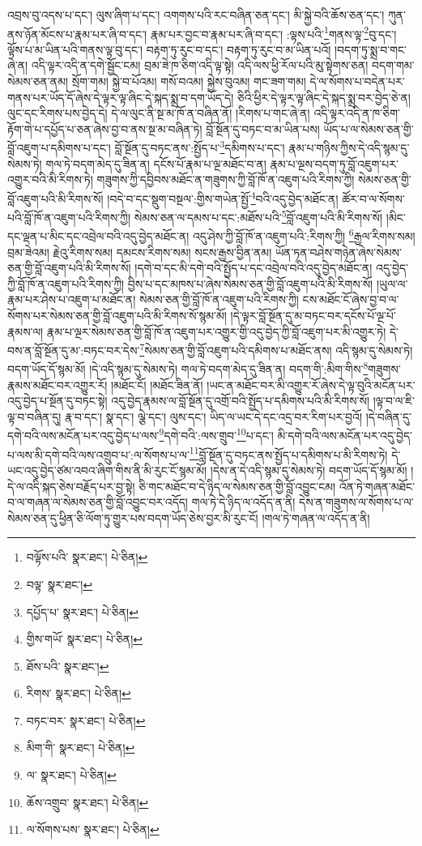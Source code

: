 འབྲས་བུ་འདས་པ་དང་། ལུས་ཞིག་པ་དང་། འགགས་པའི་རང་བཞིན་ཅན་དང་། མི་སྐྱེ་བའི་ཆོས་ཅན་དང་། ཀུན་ནས་ཉོན་མོངས་པ་རྣམ་པར་ཞི་བ་དང་། རྣམ་པར་བྱང་བ་རྣམ་པར་ཞི་བ་དང་། :ལྟས་པའི་\footnote{བལྟོས་པའི་  སྣར་ཐང་།  པེ་ཅིན། }གནས་ལྟ་\footnote{བལྟ་  སྣར་ཐང་། }བུ་དང་། ལྟོས་པ་མ་ཡིན་པའི་གནས་ལྟ་བུ་དང་། བརྟག་ཏུ་རུང་བ་དང་། བརྟག་ཏུ་རུང་བ་མ་ཡིན་པའོ། །བདག་ཏུ་སྨྲ་བ་གང་ཞེ་ན། འདི་ལྟར་འདི་ན་དགེ་སྦྱོང་ངམ། བྲམ་ཟེ་ཁ་ཅིག་འདི་ལྟ་སྟེ། འདི་ལས་ཕྱི་རོལ་པའི་མུ་སྟེགས་ཅན། བདག་གམ་སེམས་ཅན་ནམ། སྲོག་གམ། སྐྱེ་བ་པོའམ། གསོ་བའམ། སྐྱེས་བུའམ། གང་ཟག་གམ། དེ་ལ་སོགས་པ་བདེན་པར་གནས་པར་ཡོད་དོ་ཞེས་དེ་ལྟར་ལྟ་ཞིང་དེ་སྐད་སྨྲ་བ་དག་ཡོད་དེ། ཅིའི་ཕྱིར་དེ་ལྟར་ལྟ་ཞིང་དེ་སྐད་སྨྲ་བར་བྱེད་ཅེ་ན། ལུང་དང་རིགས་པས་བྱེད་དེ། དེ་ལ་ལུང་ནི་སྔ་མ་ཁོ་ན་བཞིན་ནོ། །རིགས་པ་གང་ཞེ་ན། འདི་ལྟར་འདི་ན་ཁ་ཅིག་རྟོག་གེ་པ་དཔྱོད་པ་ཅན་ཞེས་བྱ་བ་ནས་སྔ་མ་བཞིན་ཏེ། བློ་སྔོན་དུ་བཏང་བ་མ་ཡིན་པས། ཡོད་པ་ལ་སེམས་ཅན་གྱི་བློ་འཇུག་པ་དམིགས་པ་དང་། བློ་སྔོན་དུ་བཏང་ནས་:སྤྱོད་པ་\footnote{དཔྱོད་པ་  སྣར་ཐང་།  པེ་ཅིན། }དམིགས་པ་དང་། རྣམ་པ་གཉིས་ཀྱིས་དེ་འདི་སྙམ་དུ་སེམས་ཏེ། གལ་ཏེ་བདག་མེད་དུ་ཟིན་ན། དངོས་པོ་རྣམ་པ་ལྔ་མཐོང་བ་ན། རྣམ་པ་ལྔས་བདག་ཏུ་བློ་འཇུག་པར་འགྱུར་བའི་མི་རིགས་ཏེ། གཟུགས་ཀྱི་དབྱིབས་མཐོང་ན་གཟུགས་ཀྱི་བློ་ཁོ་ན་འཇུག་པའི་རིགས་ཀྱི། སེམས་ཅན་གྱི་བློ་འཇུག་པའི་མི་རིགས་སོ། །བདེ་བ་དང་སྡུག་བསྔལ་:གྱིས་གཡེན་སྤྱོ་\footnote{གྱིས་གཡོ་  སྣར་ཐང་།  པེ་ཅིན། }བའི་འདུ་བྱེད་མཐོང་ན། ཚོར་བ་ལ་སོགས་པའི་བློ་ཁོ་ན་འཇུག་པའི་རིགས་ཀྱི། སེམས་ཅན་ལ་དམས་པ་དང་:མཐོས་པའི་\footnote{ཐོས་པའི་  སྣར་ཐང་། }བློ་འཇུག་པའི་མི་རིགས་སོ། །མིང་དང་ལྡན་པ་མིང་དང་འབྲེལ་བའི་འདུ་བྱེད་མཐོང་ན། འདུ་ཤེས་ཀྱི་བློ་ཁོ་ན་འཇུག་པའི་:རིགས་ཀྱི། \footnote{རིགས་  སྣར་ཐང་།  པེ་ཅིན། }རྒྱལ་རིགས་སམ། བྲམ་ཟེའམ། རྗེའུ་རིགས་སམ། དམངས་རིགས་སམ། སངས་རྒྱས་བྱིན་ནམ། ཡོན་ཏན་བཤེས་གཉེན་ཞེས་སེམས་ཅན་གྱི་བློ་འཇུག་པའི་མི་རིགས་སོ། །དགེ་བ་དང་མི་དགེ་བའི་སྤྱོད་པ་དང་འབྲེལ་བའི་འདུ་བྱེད་མཐོང་ན། འདུ་བྱེད་ཀྱི་བློ་ཁོ་ན་འཇུག་པའི་རིགས་ཀྱི། བྱིས་པ་དང་མཁས་པ་ཞེས་སེམས་ཅན་གྱི་བློ་འཇུག་པའི་མི་རིགས་སོ། །ཡུལ་ལ་རྣམ་པར་ཤེས་པ་འཇུག་པ་མཐོང་ན། སེམས་ཅན་གྱི་བློ་ཁོ་ན་འཇུག་པའི་རིགས་ཀྱི། ངས་མཐོང་ངོ་ཞེས་བྱ་བ་ལ་སོགས་པར་སེམས་ཅན་གྱི་བློ་འཇུག་པའི་མི་རིགས་སོ་སྙམ་མོ། །དེ་ལྟར་བློ་སྔོན་དུ་མ་བཏང་བར་དངོས་པོ་ལྔ་པོ་རྣམས་ལ། རྣམ་པ་ལྔར་སེམས་ཅན་གྱི་བློ་ཁོ་ན་འཇུག་པར་འགྱུར་གྱི་འདུ་བྱེད་ཀྱི་བློ་འཇུག་པར་མི་འགྱུར་ཏེ། དེ་བས་ན་བློ་སྔོན་དུ་མ་:བཏང་བར་དེས་\footnote{བཏང་བར་  སྣར་ཐང་།  པེ་ཅིན། }སེམས་ཅན་གྱི་བློ་འཇུག་པའི་དམིགས་པ་མཐོང་ནས། འདི་སྙམ་དུ་སེམས་ཏེ། བདག་ཡོད་དོ་སྙམ་མོ། །དེ་འདི་སྙམ་དུ་སེམས་ཏེ། གལ་ཏེ་བདག་མེད་དུ་ཟིན་ན། བདག་གི་:མིག་གིས་\footnote{མིག་གི་  སྣར་ཐང་།  པེ་ཅིན། }གཟུགས་རྣམས་མཐོང་བར་འགྱུར་རོ། །མཐོང་ངོ། །མཐོང་ཟིན་ནོ། །ཡང་ན་མཐོང་བར་མི་འགྱུར་རོ་ཞེས་དེ་ལྟ་བུའི་མངོན་པར་འདུ་བྱེད་པ་སྔོན་དུ་བཏང་སྟེ། འདུ་བྱེད་རྣམས་ལ་བློ་སྔོན་དུ་འགྲོ་བའི་སྤྱོད་པ་དམིགས་པའི་མི་རིགས་སོ། །ལྟ་བ་ལ་ཇི་ལྟ་བ་བཞིན་དུ། རྣ་བ་དང་། སྣ་དང་། ལྕེ་དང་། ལུས་དང་། ཡིད་ལ་ཡང་དེ་དང་འདྲ་བར་རིག་པར་བྱའོ། །དེ་བཞིན་དུ་དགེ་བའི་ལས་མངོན་པར་འདུ་བྱེད་པ་ལས་\footnote{ལ་  སྣར་ཐང་།  པེ་ཅིན། }དགེ་བའི་:ལས་གྲུབ་\footnote{ཆོས་འགྲུབ་  སྣར་ཐང་།  པེ་ཅིན། }པ་དང་། མི་དགེ་བའི་ལས་མངོན་པར་འདུ་བྱེད་པ་ལས་མི་དགེ་བའི་ལས་འགྲུབ་པ་:ལ་སོགས་པ་ལ་\footnote{ལ་སོགས་པས་  སྣར་ཐང་།  པེ་ཅིན། }བློ་སྔོན་དུ་བཏང་ནས་སྤྱོད་པ་དམིགས་པ་མི་རིགས་ཏེ། དེ་ཡང་འདུ་བྱེད་ཙམ་འབའ་ཞིག་གིས་ནི་མི་རུང་ངོ་སྙམ་མོ། །དེས་ན་དེ་འདི་སྙམ་དུ་སེམས་ཏེ། བདག་ཡོད་དོ་སྙམ་མོ། །དེ་ལ་འདི་སྐད་ཅེས་བརྗོད་པར་བྱ་སྟེ། ཅི་གང་མཐོང་བ་དེ་ཉིད་ལ་སེམས་ཅན་གྱི་བློ་འབྱུང་ངམ། འོན་ཏེ་གཞན་མཐོང་བ་ལ་གཞན་ལ་སེམས་ཅན་གྱི་བློ་འབྱུང་བར་འདོད། གལ་ཏེ་དེ་ཉིད་ལ་འདོད་ན་ནི། དེས་ན་གཟུགས་ལ་སོགས་པ་ལ་སེམས་ཅན་དུ་ཕྱིན་ཅི་ལོག་ཏུ་གྱུར་པས་བདག་ཡོད་ཅེས་བྱར་མི་རུང་ངོ། །གལ་ཏེ་གཞན་ལ་འདོད་ན་ནི། 